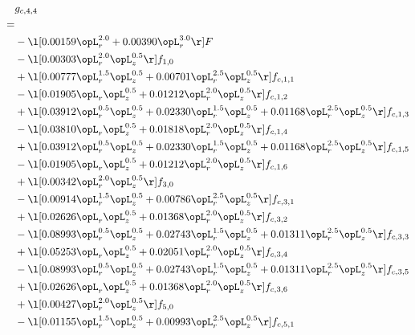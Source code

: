 \begin{alignat}{2} 
\label{eq:g_44_0} 
& g_{c,4,4} \nonumber \\ 
 = \\ 
& - \l[  0.00159 \opL_r^{2.0} +  0.00390 \opL_r^{3.0}  \r] F \nonumber \\ 
& - \l[  0.00303 \opL_r^{2.0} \opL_z^{0.5}  \r] f_{1,0} \nonumber \\ 
& + \l[  0.00777 \opL_r^{1.5} \opL_z^{0.5} +  0.00701 \opL_r^{2.5} \opL_z^{0.5}  \r] f_{c,1,1} \nonumber \\ 
& - \l[  0.01905 \opL_r \opL_z^{0.5} +  0.01212 \opL_r^{2.0} \opL_z^{0.5}  \r] f_{c,1,2} \nonumber \\ 
& + \l[  0.03912 \opL_r^{0.5} \opL_z^{0.5} +  0.02330 \opL_r^{1.5} \opL_z^{0.5} +  0.01168 \opL_r^{2.5} \opL_z^{0.5}  \r] f_{c,1,3} \nonumber \\ 
& - \l[  0.03810 \opL_r \opL_z^{0.5} +  0.01818 \opL_r^{2.0} \opL_z^{0.5}  \r] f_{c,1,4} \nonumber \\ 
& + \l[  0.03912 \opL_r^{0.5} \opL_z^{0.5} +  0.02330 \opL_r^{1.5} \opL_z^{0.5} +  0.01168 \opL_r^{2.5} \opL_z^{0.5}  \r] f_{c,1,5} \nonumber \\ 
& - \l[  0.01905 \opL_r \opL_z^{0.5} +  0.01212 \opL_r^{2.0} \opL_z^{0.5}  \r] f_{c,1,6} \nonumber \\ 
& + \l[  0.00342 \opL_r^{2.0} \opL_z^{0.5}  \r] f_{3,0} \nonumber \\ 
& - \l[  0.00914 \opL_r^{1.5} \opL_z^{0.5} +  0.00786 \opL_r^{2.5} \opL_z^{0.5}  \r] f_{c,3,1} \nonumber \\ 
& + \l[  0.02626 \opL_r \opL_z^{0.5} +  0.01368 \opL_r^{2.0} \opL_z^{0.5}  \r] f_{c,3,2} \nonumber \\ 
& - \l[  0.08993 \opL_r^{0.5} \opL_z^{0.5} +  0.02743 \opL_r^{1.5} \opL_z^{0.5} +  0.01311 \opL_r^{2.5} \opL_z^{0.5}  \r] f_{c,3,3} \nonumber \\ 
& + \l[  0.05253 \opL_r \opL_z^{0.5} +  0.02051 \opL_r^{2.0} \opL_z^{0.5}  \r] f_{c,3,4} \nonumber \\ 
& - \l[  0.08993 \opL_r^{0.5} \opL_z^{0.5} +  0.02743 \opL_r^{1.5} \opL_z^{0.5} +  0.01311 \opL_r^{2.5} \opL_z^{0.5}  \r] f_{c,3,5} \nonumber \\ 
& + \l[  0.02626 \opL_r \opL_z^{0.5} +  0.01368 \opL_r^{2.0} \opL_z^{0.5}  \r] f_{c,3,6} \nonumber \\ 
& + \l[  0.00427 \opL_r^{2.0} \opL_z^{0.5}  \r] f_{5,0} \nonumber \\ 
& - \l[  0.01155 \opL_r^{1.5} \opL_z^{0.5} +  0.00993 \opL_r^{2.5} \opL_z^{0.5}  \r] f_{c,5,1} \nonumber \\ 

\end{alignat}
